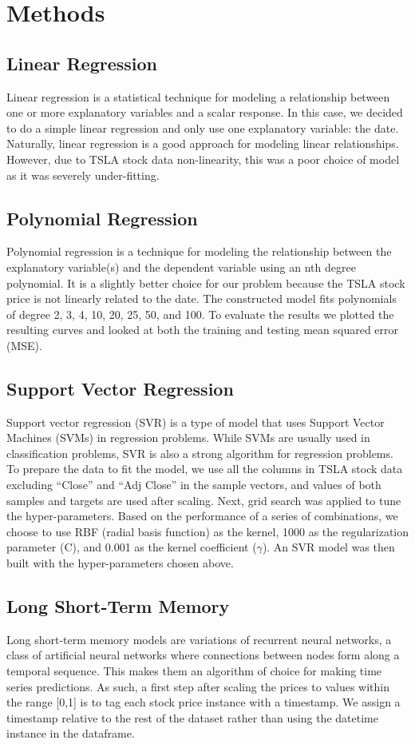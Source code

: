 \documentclass[12pt,a4paper]{article}
\begin{document}
\section{Methods}
\subsection{Linear Regression}
Linear regression is a statistical technique for modeling a relationship between one or more explanatory variables and a scalar response. In this case, we decided to do a simple linear regression and only use one explanatory variable: the date. Naturally, linear regression is a good approach for modeling linear relationships. However, due to TSLA stock data non-linearity, this was a poor choice of model as it was severely under-fitting.

\subsection{Polynomial Regression}
Polynomial regression is a technique for modeling the relationship between the explanatory variable(s) and the dependent variable using an nth degree polynomial. It is a slightly better choice for our problem because the TSLA stock price is not linearly related to the date. The constructed model fits polynomials of degree 2, 3, 4, 10, 20, 25, 50, and 100. To evaluate the results we plotted the resulting curves and looked at both the training and testing mean squared error (MSE).

\subsection{Support Vector Regression}
Support vector regression (SVR) is a type of model that uses Support Vector Machines (SVMs) in regression problems. While SVMs are usually used in classification problems, SVR is also a strong algorithm for regression problems. To prepare the data to fit the model, we use all the columns in TSLA stock data excluding “Close” and “Adj Close” in the sample vectors, and values of both samples and targets are used after scaling. 
Next, grid search was applied to tune the hyper-parameters. Based on the performance of a series of combinations, we choose to use RBF (radial basis function) as the kernel, 1000 as the regularization parameter (C), and 0.001 as the kernel coefficient ($\gamma$). An SVR model was then built with the hyper-parameters chosen above. 

\subsection{Long Short-Term Memory}
Long short-term memory models are variations of recurrent neural networks, a class of artificial neural networks where connections between nodes form along a temporal sequence. This makes them an algorithm of choice for making time series predictions. As such, a first step after scaling the prices to values within the range [0,1] is to tag each stock price instance with a timestamp. We assign a timestamp relative to the rest of the dataset rather than using the datetime instance in the dataframe.
\end{document}
